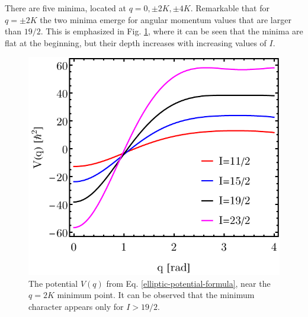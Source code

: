 There are five minima, located at $q=0,\pm2K,\pm4K$. Remarkable that for $q=\pm2K$ the two minima emerge for angular momentum values that are larger than $19/2$. This is emphasized in Fig. \ref{elliptic-potential-plot-2k-minima}, where it can be seen that the minima are flat at the beginning, but their depth increases with increasing values of $I$.
\begin{figure}
    \centering
    \includegraphics[scale=0.85]{Chapters/Figures/Elliptic-Potential-2K-Minima.pdf}
    \caption{The potential $V(q)$ from Eq. \ref{elliptic-potential-formula}, near the $q=2K$ minimum point. It can be observed that the minimum character appears only for $I>19/2$.}
    \label{elliptic-potential-plot-2k-minima}
\end{figure}

